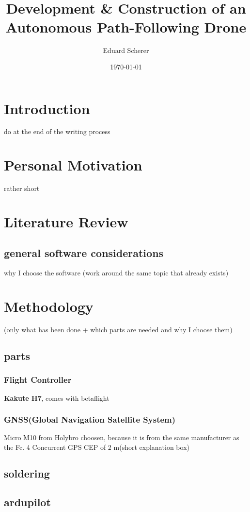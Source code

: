 \documentclass{article}
\author{Eduard Scherer}
\title{Development \& Construction of an Autonomous Path-Following Drone}
\date{\today}
\begin{document}
\maketitle
	\section{Introduction}
	do at the end of the writing process
	\section{Personal Motivation}
	rather short
	\section{Literature Review}
	\subsection{general software considerations}
	why I choose the software
	(work around the same topic that already exists)
	\section{Methodology}
	(only what has been done + which parts are needed and why I choose them)
	\subsection{parts}
	
	\subsubsection[Fc]{Flight Controller}
	\textbf{Kakute H7}, comes with betaflight
	
	
	\subsubsection{GNSS(Global Navigation Satellite System)}
	Micro M10 from Holybro choosen, because it is from the same manufacturer as the Fc.
	4 Concurrent GPS
	CEP of 2 m(short explanation box)
	
	
	
	\subsection{soldering}
	
	\subsection{ardupilot}
\end{document}
